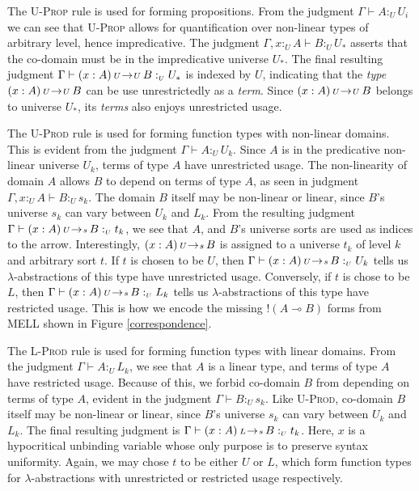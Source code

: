 \documentclass{article}
\theoremstyle{definition}
\newcommand{\rname}[1]{\textsc{\footnotesize #1}}
\newcommand{\utype}{:_{\scriptscriptstyle U}}
\newcommand{\arw}[2]
{\hspace*{0.2em}{\scriptstyle #1}\hspace*{-0.2em}
\rightarrow
\hspace*{-0.2em}{\scriptstyle #2}\hspace*{0.2em}}
\begin{document}
  The \rname{U-Prop} rule is used for forming propositions. From the judgment $\Gamma \vdash A \utype U_i$ we can see that \rname{U-Prop} allows for quantification over non-linear types of arbitrary level, hence impredicative. The judgment $\Gamma, x \utype A \vdash B \utype U_*$ asserts that the co-domain must be in the impredicative universe $U_*$. The final resulting judgment $\Gamma \vdash (x : A) \arw{U}{U} B \utype U_*$ is indexed by $U$, indicating that the \textit{type} $(x : A) \arw{U}{U} B$ can be use unrestrictedly as a \textit{term}. Since $(x : A) \arw{U}{U} B$ belongs to universe $U_*$, its \textit{terms} also enjoys unrestricted usage.

  The \rname{U-Prod} rule is used for forming function types with non-linear domains. This is evident from the judgment $\Gamma \vdash A \utype U_k$. Since $A$ is in the predicative non-linear universe $U_k$, terms of type $A$ have unrestricted usage. The non-linearity of domain $A$ allows $B$ to depend on terms of type $A$, as seen in judgment $\Gamma, x \utype A \vdash B \utype s_k$. The domain $B$ itself may be non-linear or linear, since $B$'s universe $s_k$ can vary between $U_k$ and $L_k$. From the resulting judgment $\Gamma \vdash (x : A) \arw{U}{s} B \utype t_k$, we see that $A$, and $B$'s universe sorts are used as indices to the arrow. Interestingly, $(x : A) \arw{U}{s} B$ is assigned to a universe $t_k$ of level $k$ and arbitrary sort $t$. If $t$ is chosen to be $U$, then $\Gamma \vdash (x : A) \arw{U}{s} B \utype U_k$ tells us $\lambda$-abstractions of this type have unrestricted usage. Conversely, if $t$ is chose to be $L$, then $\Gamma \vdash (x : A) \arw{U}{s} B \utype L_k$ tells us $\lambda$-abstractions of this type have restricted usage. This is how we encode the missing $!(A \multimap B)$ forms from MELL shown in Figure \ref{correspondence}.

  The \rname{L-Prod} rule is used for forming function types with linear domains. From the judgment $\Gamma \vdash A \utype L_k$, we see that $A$ is a linear type, and terms of type $A$ have restricted usage. Because of this, we forbid co-domain $B$ from depending on terms of type $A$, evident in the judgment $\Gamma \vdash B \utype s_k$. Like \rname{U-Prod}, co-domain $B$ itself may be non-linear or linear, since $B$'s universe $s_k$ can vary between $U_k$ and $L_k$. The final resulting judgment is $\Gamma \vdash (x : A) \arw{L}{s} B \utype t_k$. Here, $x$ is a hypocritical unbinding variable whose only purpose is to preserve syntax uniformity. Again, we may chose $t$ to be either $U$ or $L$, which form function types for $\lambda$-abstractions with unrestricted or restricted usage respectively.
\end{document}
